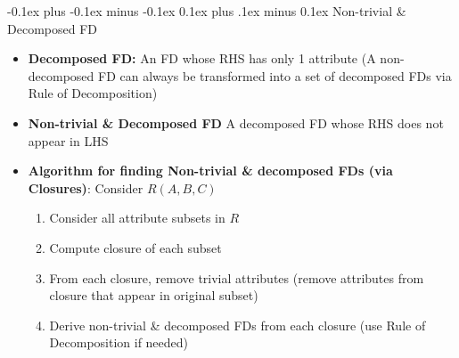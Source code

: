 \documentclass[landscape]{article}
\makeatletter
\renewcommand{\subsection}{\@startsection{subsection}{2}{0mm}%
  {-0.1ex plus -0.1ex minus -0.1ex}%
  {0.1ex plus .1ex minus 0.1ex}%
{\normalfont\scriptsize\bfseries}}
\makeatother
\begin{document}
\begin{multicols*}{5}
    \subsection{Non-trivial \& Decomposed FD}
    \begin{itemize}
      \item \textbf{Decomposed FD:} An FD whose RHS has only 1 attribute (A non-decomposed FD can always be transformed into a set of decomposed FDs via Rule of Decomposition)
      \item \textbf{Non-trivial \& Decomposed FD} A decomposed FD whose RHS does not appear in LHS
      \item \textbf{Algorithm for finding Non-trivial \& decomposed FDs (via Closures)}: Consider $R(A,B,C)$
      \begin{enumerate}
        \item Consider all attribute subsets in $R$
        \item Compute closure of each subset
        \item From each closure, remove trivial attributes (remove attributes from closure that appear in original subset)
        \item Derive non-trivial \& decomposed FDs from each closure (use Rule of Decomposition if needed)
      \end{enumerate}
    \end{itemize}


\end{multicols*}
\end{document}
